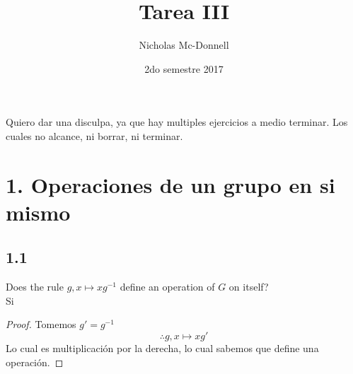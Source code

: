 \documentclass[11pt]{article}
\title{Tarea III}
\author{Nicholas Mc-Donnell}
\date{2do semestre 2017}
\theoremstyle{definition}
\begin{document}
        \maketitle
        \newpage

        \tableofcontents
        \newpage

        Quiero dar una disculpa, ya que hay multiples ejercicios a medio terminar. Los cuales no alcance, ni borrar, ni terminar.
        \section{1. Operaciones de un grupo en si mismo}
        \subsection{1.1}
        Does the rule $g,x\mapsto xg^{-1}$ define an operation of $G$ on itself?\\
        Si
        \begin{proof}
            Tomemos $g'=g^{-1}$
            \[\therefore g,x\mapsto xg'\]
            Lo cual es multiplicación por la derecha, lo cual sabemos que define una operación.
        \end{proof}
\end{document}
